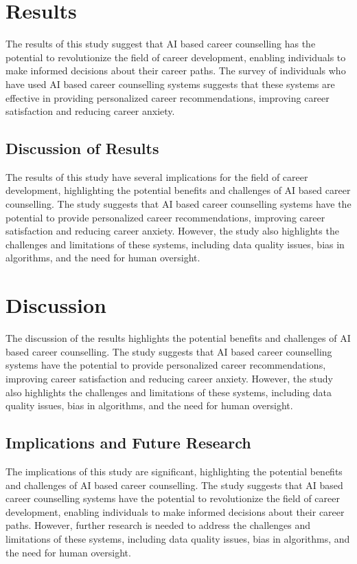 \documentclass[12pt,a4paper]{article}
\begin{document}
\section{Results}
The results of this study suggest that AI based career counselling has the potential to revolutionize the field of career development, enabling individuals to make informed decisions about their career paths. The survey of individuals who have used AI based career counselling systems suggests that these systems are effective in providing personalized career recommendations, improving career satisfaction and reducing career anxiety.

\subsection{Discussion of Results}
The results of this study have several implications for the field of career development, highlighting the potential benefits and challenges of AI based career counselling. The study suggests that AI based career counselling systems have the potential to provide personalized career recommendations, improving career satisfaction and reducing career anxiety. However, the study also highlights the challenges and limitations of these systems, including data quality issues, bias in algorithms, and the need for human oversight.

\section{Discussion}
The discussion of the results highlights the potential benefits and challenges of AI based career counselling. The study suggests that AI based career counselling systems have the potential to provide personalized career recommendations, improving career satisfaction and reducing career anxiety. However, the study also highlights the challenges and limitations of these systems, including data quality issues, bias in algorithms, and the need for human oversight.

\subsection{Implications and Future Research}
The implications of this study are significant, highlighting the potential benefits and challenges of AI based career counselling. The study suggests that AI based career counselling systems have the potential to revolutionize the field of career development, enabling individuals to make informed decisions about their career paths. However, further research is needed to address the challenges and limitations of these systems, including data quality issues, bias in algorithms, and the need for human oversight.
\end{document}
